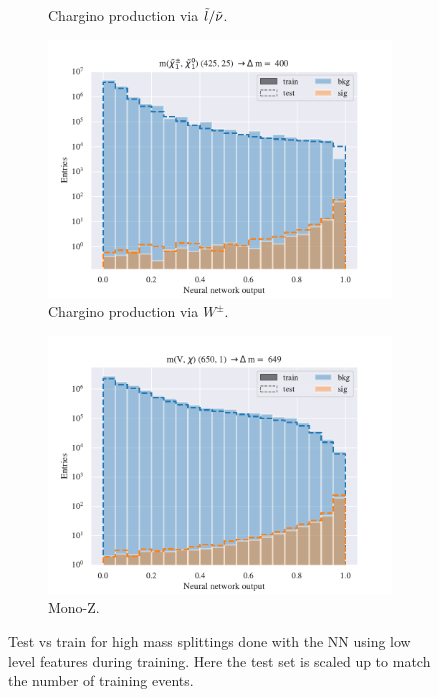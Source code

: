 \begin{figure}[H]
\begin{subfigure}[t!]{0.49\textwidth}
        \caption{Chargino production via $\Tilde{l}/\Tilde{\nu}$.}
        \label{fig:}
    \end{subfigure}    
    \begin{subfigure}[t!]{0.49\textwidth}
        \includegraphics[width = \textwidth]{Figures/WW/NN/Low_level/High/scaled_train_test_395330.pdf}
        \caption{Chargino production via $W^\pm$.}
        \label{fig:}
    \end{subfigure}
    \begin{subfigure}[t!]{0.49\textwidth}
        \includegraphics[width = \textwidth]{Figures/Mono_Z/ML/NN/Low_level/High/scaled_train_test_310617.pdf}
        \caption{Mono-Z.}
        \label{fig:}
    \end{subfigure}
    \caption{Test vs train for high mass splittings done with the NN using low level features during training. Here the test set is scaled up to match the number of training events.}
    \label{fig:}
\end{figure}


